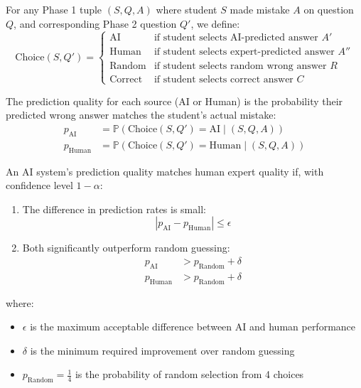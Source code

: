 \begin{definition}\label{def:prediction_quality}
For any Phase 1 tuple $(S,Q,A)$ where student $S$ made mistake $A$ on question $Q$, and corresponding Phase 2 question $Q'$, we define:
\[
\mathrm{Choice}(S,Q') = 
\begin{cases}
\mathrm{AI} & \text{if student selects AI-predicted answer } A' \\[0.5em]
\mathrm{Human} & \text{if student selects expert-predicted answer } A'' \\[0.5em]
\mathrm{Random} & \text{if student selects random wrong answer } R \\[0.5em]
\mathrm{Correct} & \text{if student selects correct answer } C
\end{cases}
\]

The prediction quality for each source (AI or Human) is the probability their predicted wrong answer matches the student's actual mistake:
\begin{align}
p_{\mathrm{AI}} &= \mathbb{P}(\mathrm{Choice}(S,Q') = \mathrm{AI} \mid (S,Q,A)) \label{eq:p_ai} \\[0.5em]
p_{\mathrm{Human}} &= \mathbb{P}(\mathrm{Choice}(S,Q') = \mathrm{Human} \mid (S,Q,A)) \label{eq:p_human}
\end{align}
\end{definition}

\begin{theorem}\label{thm:statistical_equivalence}
An AI system's prediction quality matches human expert quality if, with confidence level $1-\alpha$:

\begin{enumerate}
\item The difference in prediction rates is small:
\begin{equation}\label{eq:equiv}
|p_{\mathrm{AI}} - p_{\mathrm{Human}}| \leq \epsilon
\end{equation}

\item Both significantly outperform random guessing:
\begin{align}
p_{\mathrm{AI}} &> p_{\mathrm{Random}} + \delta \label{eq:ai_random} \\
p_{\mathrm{Human}} &> p_{\mathrm{Random}} + \delta \label{eq:human_random}
\end{align}
\end{enumerate}

where:
\begin{itemize}
\item $\epsilon$ is the maximum acceptable difference between AI and human performance
\item $\delta$ is the minimum required improvement over random guessing
\item $p_{\mathrm{Random}} = \frac{1}{4}$ is the probability of random selection from 4 choices
\end{itemize}
\end{theorem}

